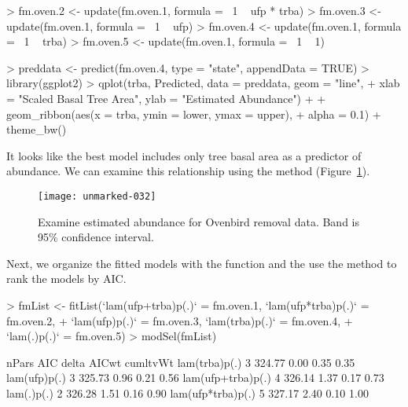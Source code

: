 \documentclass[article,shortnames]{jss}
\begin{document}
{\begin{Schunk}
\begin{Sinput}
> fm.oven.2 <- update(fm.oven.1, formula = ~1 ~ ufp * trba)
> fm.oven.3 <- update(fm.oven.1, formula = ~1 ~ ufp)
> fm.oven.4 <- update(fm.oven.1, formula = ~1 ~ trba)
> fm.oven.5 <- update(fm.oven.1, formula = ~1 ~ 1)
\end{Sinput}
\end{Schunk}


\begin{Schunk}
\begin{Sinput}
> preddata <- predict(fm.oven.4, type = "state", appendData = TRUE)
> library(ggplot2)
> qplot(trba, Predicted, data = preddata, geom = "line", 
+     xlab = "Scaled Basal Tree Area", ylab = "Estimated Abundance") + 
+     geom_ribbon(aes(x = trba, ymin = lower, ymax = upper), 
+         alpha = 0.1) + theme_bw()
\end{Sinput}
\end{Schunk}




It looks like the best model includes only tree basal area as a
predictor of abundance.  We can examine this relationship using
the  method (Figure~\ref{fig:pred}).


\begin{figure}[th!]
  \centering
\texttt{[image: unmarked-032]}
\caption{Examine estimated abundance for Ovenbird removal data.  Band
  is 95\% confidence interval.}
\label{fig:pred}
\end{figure}


Next, we organize the fitted models with the  function and
the use the  method to rank the models by AIC.

\begin{Schunk}
\begin{Sinput}
> fmList <- fitList(`lam(ufp+trba)p(.)` = fm.oven.1, `lam(ufp*trba)p(.)` = fm.oven.2, 
+     `lam(ufp)p(.)` = fm.oven.3, `lam(trba)p(.)` = fm.oven.4, 
+     `lam(.)p(.)` = fm.oven.5)
> modSel(fmList)
\end{Sinput}
\begin{Soutput}
                  nPars    AIC delta AICwt cumltvWt
lam(trba)p(.)         3 324.77  0.00  0.35     0.35
lam(ufp)p(.)          3 325.73  0.96  0.21     0.56
lam(ufp+trba)p(.)     4 326.14  1.37  0.17     0.73
lam(.)p(.)            2 326.28  1.51  0.16     0.90
lam(ufp*trba)p(.)     5 327.17  2.40  0.10     1.00
\end{Soutput}
\end{Schunk}



}
\end{document}

